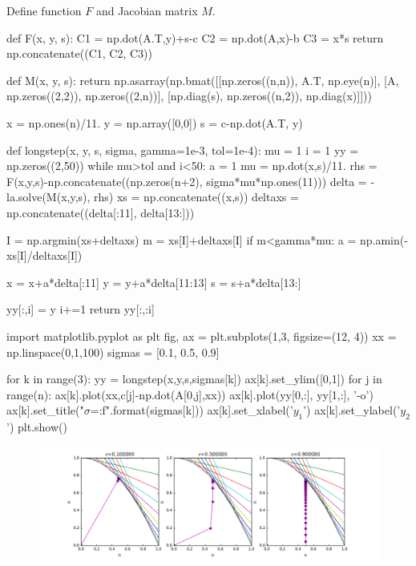 \documentclass{article}
\begin{document}
\begin{itemize}
Define function $F$ and Jacobian matrix $M$.

\begin{ipythonnb}
def F(x, y, s):
    C1 = np.dot(A.T,y)+s-c
    C2 = np.dot(A,x)-b
    C3 = x*s
    return np.concatenate((C1, C2, C3))

def M(x, y, s):
    return np.asarray(np.bmat([[np.zeros((n,n)), A.T, np.eye(n)],
                    [A, np.zeros((2,2)), np.zeros((2,n))],
                    [np.diag(s), np.zeros((n,2)), np.diag(x)]]))
\end{ipythonnb}

\begin{ipythonnb}
x = np.ones(n)/11.
y = np.array([0,0])
s = c-np.dot(A.T, y)
\end{ipythonnb}

\begin{ipythonnb}
def longstep(x, y, s, sigma, gamma=1e-3, tol=1e-4): 
    mu = 1
    i = 1
    yy = np.zeros((2,50))
    while mu>tol and i<50:
        a = 1
        mu = np.dot(x,s)/11.
        rhs = F(x,y,s)-np.concatenate((np.zeros(n+2), sigma*mu*np.ones(11)))
        delta = -la.solve(M(x,y,s), rhs)
        xs = np.concatenate((x,s))
        deltaxs = np.concatenate((delta[:11], delta[13:]))
    
        I = np.argmin(xs+deltaxs)
        m = xs[I]+deltaxs[I]
        if m<gamma*mu:
            a = np.amin(-xs[I]/deltaxs[I])
    
        x = x+a*delta[:11]
        y = y+a*delta[11:13]
        s = s+a*delta[13:]
    
        yy[:,i] = y
        i+=1
    return yy[:,:i]
\end{ipythonnb}

\begin{ipythonnb}
import matplotlib.pyplot as plt
fig, ax = plt.subplots(1,3, figsize=(12, 4))
xx = np.linspace(0,1,100)
sigmas = [0.1, 0.5, 0.9]

for k in range(3):
    yy = longstep(x,y,s,sigmas[k])
    ax[k].set_ylim([0,1])
    for j in range(n):
        ax[k].plot(xx,c[j]-np.dot(A[0,j],xx))
    ax[k].plot(yy[0,:], yy[1,:], '-o')
    ax[k].set_title("$\sigma$={:f}".format(sigmas[k]))
    ax[k].set_xlabel('$y_1$')
    ax[k].set_ylabel('$y_2$')
plt.show()
\end{ipythonnb}

 \begin{figure}[h!]
  \centering
  \includegraphics[width=1\textwidth]{images/central.png}
 \end{figure}


\end{itemize}
\end{document}
